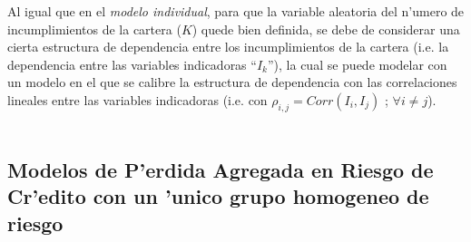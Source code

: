 \documentclass[10pt, oneside]{article}
\begin{document}
\begin{enumerate}
\noindent
Al igual que en el \emph{modelo individual}, para que la variable aleatoria del n'umero de incumplimientos de la cartera ($K$) quede bien definida, se debe de considerar una cierta estructura de dependencia entre los incumplimientos de la cartera (i.e. la dependencia entre las variables indicadoras ``$I_k$''), la cual se puede modelar con un modelo en el que se calibre la estructura de dependencia con las correlaciones lineales entre las variables indicadoras (i.e. con $\rho_{i,j} = Corr(I_i, I_j)$ ; $\forall i \neq j$).\\\\


\end{enumerate}

\subsection*{Modelos de P'erdida Agregada en Riesgo de Cr'edito con un 'unico grupo homogeneo de riesgo}
\end{document}
